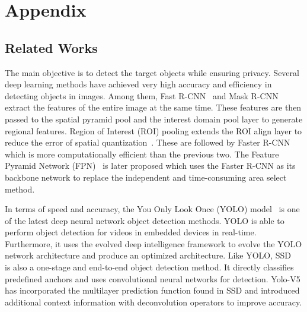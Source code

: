 \documentclass[journal,transmag]{IEEEtran}
\begin{document}
\section*{Appendix}
\subsection{Related Works}
The main objective is to detect the target objects while ensuring privacy.  
Several deep learning methods have achieved very high accuracy and efficiency in detecting objects in images. 
Among them, Fast R-CNN~\cite{ren2016faster} and Mask R-CNN~\cite{he2017mask} extract the features of the entire image at the same time.
These features are then passed to the spatial pyramid pool and the interest domain pool layer to generate regional features. 
Region of Interest (ROI) pooling extends the ROI align layer to reduce the error of spatial quantization~\cite{puzicha2000spatial}. 
These are followed by Faster R-CNN~\cite{ren2016faster} which is more computationally efficient than the previous two. 
The Feature Pyramid Network (FPN)~\cite{lin2017feature} is later proposed which uses the Faster R-CNN as its backbone network to replace the independent and time-consuming area select method.

In terms of speed and accuracy, the You Only Look Once (YOLO) model~\cite{farhadi2018yolov3,redmon2016you} is one of the latest deep neural network object detection methods. 
YOLO is able to perform object detection for videos in embedded devices in real-time. Furthermore, it uses the evolved deep intelligence framework to evolve the YOLO network architecture and produce an optimized architecture.
Like YOLO, SSD~\cite{liu2016ssd} is also a one-stage and end-to-end object detection method. 
It directly classifies predefined anchors and uses convolutional neural networks for detection. 
Yolo-V5 has incorporated the multilayer prediction function found in SSD and introduced additional context information with deconvolution operators to improve accuracy.
\end{document}
